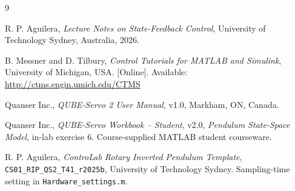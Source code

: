 \documentclass[11pt,a4paper]{article}
\begin{document}
\begin{thebibliography}{9}

R. P. Aguilera, \emph{Lecture Notes on State-Feedback Control}, University of
Technology Sydney, Australia, 2026.

B. Messner and D. Tilbury, \emph{Control Tutorials for MATLAB and Simulink},
University of Michigan, USA. [Online]. Available:
\url{http://ctms.engin.umich.edu/CTMS}

Quanser Inc., \emph{QUBE-Servo 2 User Manual}, v1.0, Markham, ON, Canada.

Quanser Inc., \emph{QUBE-Servo Workbook -- Student}, v2.0,
\emph{Pendulum State-Space Model}, in-lab exercise 6.
Course-supplied MATLAB student courseware.

R. P. Aguilera, \emph{ControLab Rotary Inverted Pendulum Template},
\texttt{CS01\_RIP\_QS2\_T41\_r2025b}, University of Technology Sydney.
Sampling-time setting in \texttt{Hardware\_settings.m}.

\end{thebibliography}
\end{document}
